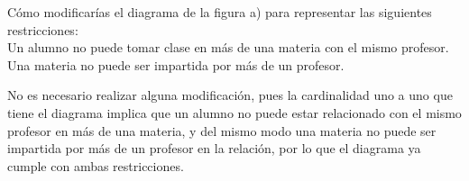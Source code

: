 
Cómo modificarías el diagrama de la figura a) para representar las siguientes restricciones:\\
Un alumno no puede tomar clase en más de una materia con el mismo profesor. Una materia no puede ser
impartida por más de un profesor.

No es necesario realizar alguna modificación, pues la cardinalidad uno a uno que tiene el diagrama implica que un alumno no puede estar relacionado con el mismo profesor en más de una materia, y del mismo modo una materia no puede ser impartida por más de un profesor en la relación, por lo que el diagrama ya cumple con ambas restricciones.
